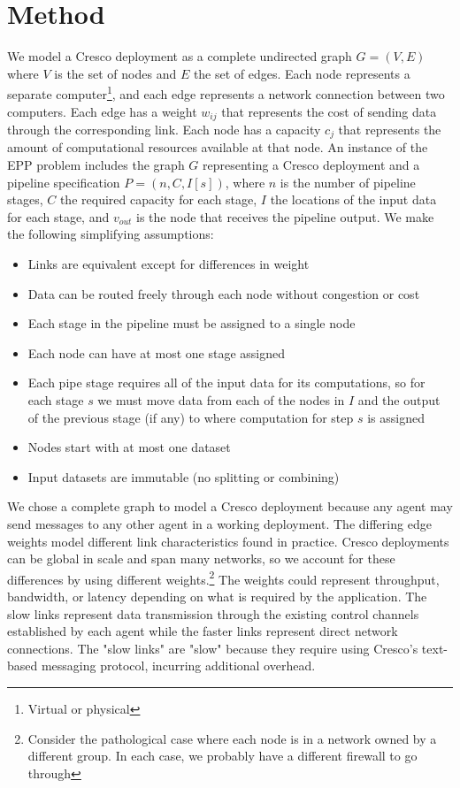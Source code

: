 \documentclass{acmart}
\newcommand{\eppInstance}{\ensuremath{n,C,I[s]}}
\begin{document}
    \section{Method}
	We model a Cresco deployment as a complete undirected graph $G=(V,E)$ where $V$ is the set of nodes and $E$ the set of edges. Each node represents a separate computer\footnote{Virtual or physical}, and each edge represents a network connection between two computers. Each edge has a weight $w_{ij}$ that represents the cost of sending data through the corresponding link. Each node has a capacity $c_{j}$ that represents the amount of computational resources available at that node. An instance of the EPP problem includes the graph $G$ representing a Cresco deployment and a pipeline specification $P = (\eppInstance)$, where  $n$ is the number of pipeline stages, $C$ the required capacity for each stage, $I$ the locations of the input data for each stage, and $v_{out}$ is the node that receives the pipeline output. We make the following simplifying assumptions:
	\begin{itemize}
		\item Links are equivalent except for differences in weight
		\item Data can be routed freely through each node without congestion or cost
		\item Each stage in the pipeline must be assigned to a single node
		\item Each node can have at most one stage assigned
		\item Each pipe stage requires all of the input data for its computations, so for each stage $s$ we must move data from each of the nodes in $I$ and the output of the previous stage (if any) to where computation for step $s$ is assigned
		\item Nodes start with at most one dataset
		\item Input datasets are immutable (no splitting or combining)
	\end{itemize}
	
	We chose a complete graph to model a Cresco deployment because any agent may send messages to any other agent in a working deployment. The differing edge weights model different link characteristics found in practice. Cresco deployments can be global in scale and span many networks, so we account for these differences by using different weights.\footnote{Consider the pathological case where each node is in a network owned by a different group. In each case, we probably have a different firewall to go through} The weights could represent throughput, bandwidth, or latency depending on what is required by the application. The slow links represent data transmission through the existing control channels established by each agent while the faster links represent direct network connections. The "slow links" are "slow" because they require using Cresco's text-based messaging protocol, incurring additional overhead.
	
\end{document}
